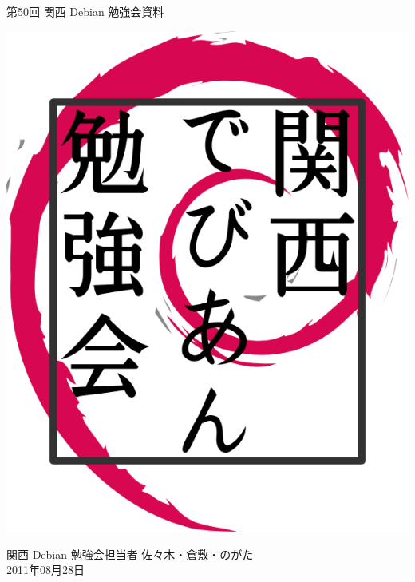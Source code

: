 \documentclass[mingoth,a4paper]{jsarticle}
\newcommand{\debmtgyear}{2011}
\newcommand{\debmtgmonth}{08}
\newcommand{\debmtgdate}{28}
\newcommand{\debmtgnumber}{50}
\begin{document}
\begin{titlepage}


 第\debmtgnumber{}回 関西 Debian 勉強会資料

\vspace{2cm}

\begin{center}
\includegraphics{image200802/kansaidebianlogo.png}
\end{center}

\begin{flushright}
\hfill{}関西 Debian 勉強会担当者 佐々木・倉敷・のがた \\
\hfill{}\debmtgyear{}年\debmtgmonth{}月\debmtgdate{}日
\end{flushright}

\thispagestyle{empty}
\end{titlepage}


\subsection*{}%
\end{document}
